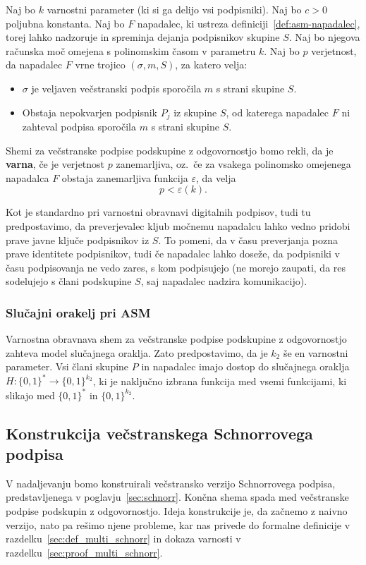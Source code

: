 \documentclass[isrm2, tisk]{fmfdelo}
\begin{document}
\begin{definicija}
\label{def:asm-varnost}
    Naj bo $k$ varnostni parameter (ki si ga delijo vsi podpisniki). Naj bo $c > 0$ poljubna konstanta. 
    Naj bo $F$ napadalec, ki ustreza definiciji~\ref{def:asm-napadalec}, torej lahko nadzoruje in
    spreminja dejanja podpisnikov skupine $S$. Naj bo njegova računska moč omejena s polinomskim časom
    v parametru $k$. Naj bo $p$ verjetnost, da napadalec $F$ vrne trojico $(\sigma, m, S)$, za katero velja: 
    \begin{itemize}
        \item $\sigma$ je veljaven večstranski podpis sporočila $m$ s strani skupine $S$.
        \item Obstaja nepokvarjen podpisnik $P_j$ iz skupine $S$, od katerega napadalec $F$ ni zahteval podpisa 
            sporočila $m$ s strani skupine $S$.
    \end{itemize}
    Shemi za večstranske 
    podpise podskupine z odgovornostjo bomo rekli, da je \textbf{varna}, če je verjetnost $p$ zanemarljiva,
    oz.\ če za vsakega polinomsko omejenega napadalca $F$ obstaja zanemarljiva funkcija $\varepsilon$,
    da velja
    $$ 
    p < \varepsilon(k).
    $$
\end{definicija}

Kot je standardno pri varnostni obravnavi digitalnih podpisov, tudi tu predpostavimo, da preverjevalec
kljub močnemu napadalcu lahko vedno pridobi prave javne ključe podpisnikov iz $S$. To pomeni, da
v času preverjanja pozna prave identitete podpisnikov, tudi če napadalec lahko doseže, da podpisniki
v času podpisovanja ne vedo zares, s kom podpisujejo (ne morejo zaupati, da res sodelujejo s člani
podskupine $S$, saj napadalec nadzira komunikacijo).

\subsubsection{Slučajni orakelj pri ASM}
Varnostna obravnava shem za večstranske podpise podskupine z odgovornostjo zahteva model slučajnega
oraklja. Zato predpostavimo, da je $k_2$ še en varnostni parameter. Vsi člani skupine $P$ in
napadalec imajo dostop do slučajnega oraklja $H: \{0, 1\}^* \rightarrow \{0, 1\}^{k_2}$, ki je
naključno izbrana funkcija med vsemi funkcijami, ki slikajo med $\{0, 1\}^*$ in $\{0, 1\}^{k_2}$.

\subsection{Konstrukcija večstranskega Schnorrovega podpisa}
V nadaljevanju bomo konstruirali večstransko verzijo Schnorrovega podpisa, predstavljenega v
poglavju~\ref{sec:schnorr}. Končna shema spada med večstranske podpise podskupin z odgovornostjo.
Ideja konstrukcije je, da začnemo z naivno verzijo, nato pa rešimo njene probleme, kar nas
privede do formalne definicije v razdelku~\ref{sec:def_multi_schnorr} in dokaza varnosti v
razdelku~\ref{sec:proof_multi_schnorr}.
\end{document}
